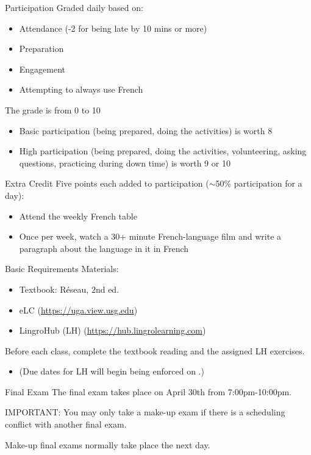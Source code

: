 \begin{frame}{Participation}
  Graded daily based on:
  \begin{itemize}
    \item Attendance (-2 for being late by 10 mins or more)
    \item Preparation
    \item Engagement
    \item Attempting to always use French
  \end{itemize}
  The grade is from 0 to 10
  \begin{itemize}
    \item Basic participation (being prepared, doing the activities) is worth \alert{8}
    \item High participation (being prepared, doing the activities, volunteering, asking questions, practicing during down time) is worth \alert{9} or \alert{10}
  \end{itemize}
\end{frame}

\begin{frame}{Extra Credit}
  Five points each added to participation ($\sim$50\% participation for a day):
  \begin{itemize}
    \item Attend the weekly French table
    \item Once per week, watch a 30+ minute French-language film and write a paragraph about the language in it \alert{in French}
  \end{itemize}
\end{frame}

\begin{frame}{Basic Requirements}
  Materials:
  \begin{itemize}
    \item Textbook: Réseau, 2nd ed.
    \item eLC (\url{https://uga.view.usg.edu})
    \item LingroHub (LH) (\url{https://hub.lingrolearning.com})
  \end{itemize}
  \alert{Before each class}, complete the textbook reading and the assigned LH exercises.
  \begin{itemize}
    \item (Due dates for LH will begin being enforced on \mflDue{}.)
  \end{itemize}
\end{frame}

\begin{frame}{Final Exam}
  The final exam takes place on \alert{April 30th} from \alert{7:00pm-10:00pm}.
  \begin{center}
    \alert{IMPORTANT}: You may only take a make-up exam if there is a scheduling conflict with another final exam.
  \end{center}
  Make-up final exams normally take place the next day.
\end{frame}

